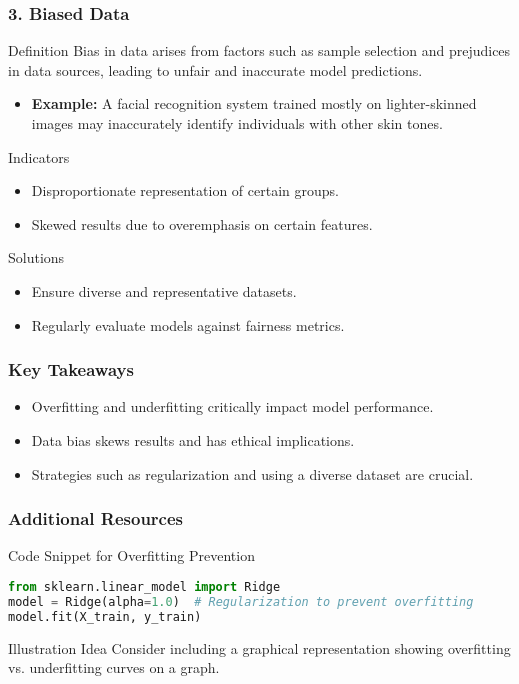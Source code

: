 \documentclass[aspectratio=169]{beamer}
\begin{document}
\begin{frame}
    \frametitle{3. Biased Data}
    \begin{block}{Definition}
        Bias in data arises from factors such as sample selection and prejudices in data sources, leading to unfair and inaccurate model predictions.
    \end{block}
    \begin{itemize}
        \item \textbf{Example:} A facial recognition system trained mostly on lighter-skinned images may inaccurately identify individuals with other skin tones.
    \end{itemize}
    
    \begin{block}{Indicators}
        \begin{itemize}
            \item Disproportionate representation of certain groups.
            \item Skewed results due to overemphasis on certain features.
        \end{itemize}
    \end{block}
    
    \begin{block}{Solutions}
        \begin{itemize}
            \item Ensure diverse and representative datasets.
            \item Regularly evaluate models against fairness metrics.
        \end{itemize}
    \end{block}
\end{frame}

\begin{frame}
    \frametitle{Key Takeaways}
    \begin{itemize}
        \item Overfitting and underfitting critically impact model performance.
        \item Data bias skews results and has ethical implications.
        \item Strategies such as regularization and using a diverse dataset are crucial.
    \end{itemize}
\end{frame}

\begin{frame}[fragile]
    \frametitle{Additional Resources}
    \begin{block}{Code Snippet for Overfitting Prevention}
    \begin{lstlisting}[language=Python]
from sklearn.linear_model import Ridge
model = Ridge(alpha=1.0)  # Regularization to prevent overfitting
model.fit(X_train, y_train)
    \end{lstlisting}
    \end{block}

    \begin{block}{Illustration Idea}
        Consider including a graphical representation showing overfitting vs. underfitting curves on a graph.
    \end{block}
\end{frame}
\end{document}
